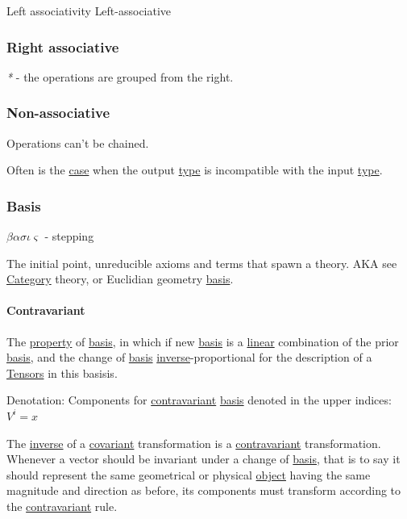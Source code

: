 \documentclass[a4paper,14pt,oneside]{book}
\begin{document}
\label{org09ffd2c}Left associativity
\label{org5fa574c}Left-associative

\subsubsection{\label{org9be211d}Right associative}
\label{sec:org4e3819f}
\emph{*} - the operations are grouped from the right.

\subsubsection{\label{org6340d46}Non-associative}
\label{sec:orgee20784}
Operations can't be chained.

Often is the \hyperref[org5ae6a43]{case} when the output \hyperref[orgde40363]{type} is incompatible with the input \hyperref[orgde40363]{type}.

\subsubsection{\label{org6496c33}Basis}
\label{sec:orgf5650c3}
\(\beta\alpha\sigma\iota\varsigma\) - stepping

The initial point, unreducible axioms and terms that spawn a theory.
AKA see \hyperref[org82baa03]{Category} theory, or Euclidian geometry \hyperref[org6496c33]{basis}.

\paragraph{\label{orgc6b6567}Contravariant}
\label{sec:org23ca306}
The \hyperref[org81d0df4]{property} of \hyperref[org6496c33]{basis}, in which if new \hyperref[org6496c33]{basis} is a \hyperref[org5ebe552]{linear} combination of the prior \hyperref[org6496c33]{basis}, and the change of \hyperref[org6496c33]{basis} \hyperref[org5ad120e]{inverse}-proportional for the description of a \hyperref[org08ef2f2]{Tensors} in this basisis.

Denotation:
Components for \hyperref[orgc6b6567]{contravariant} \hyperref[org6496c33]{basis} denoted in the upper indices:
\(V^{i} = x\)

The \hyperref[org5ad120e]{inverse} of a \hyperref[org07465dc]{covariant} transformation is a \hyperref[orgc6b6567]{contravariant} transformation. Whenever a vector should be invariant under a change of \hyperref[org6496c33]{basis}, that is to say it should represent the same geometrical or physical \hyperref[org8d6cd26]{object} having the same magnitude and direction as before, its components must transform according to the \hyperref[orgc6b6567]{contravariant} rule.
\end{document}
